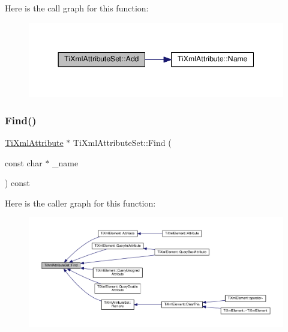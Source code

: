Here is the call graph for this function\+:\nopagebreak
\begin{figure}[H]
\begin{center}
\leavevmode
\includegraphics[width=344pt]{class_ti_xml_attribute_set_a745e50ddaae3bee93e4589321e0b9c1a_cgraph}
\end{center}
\end{figure}
\mbox{\label{class_ti_xml_attribute_set_a6d4f03bb84f70c78171db27a869225c1}} 
\subsubsection{\texorpdfstring{Find()}{Find()}}
{\footnotesize\ttfamily \hyperlink{class_ti_xml_attribute}{Ti\+Xml\+Attribute} $\ast$ Ti\+Xml\+Attribute\+Set\+::\+Find (\begin{DoxyParamCaption}\item[{const char $\ast$}]{\+\_\+name }\end{DoxyParamCaption}) const}

Here is the caller graph for this function\+:\nopagebreak
\begin{figure}[H]
\begin{center}
\leavevmode
\includegraphics[width=350pt]{class_ti_xml_attribute_set_a6d4f03bb84f70c78171db27a869225c1_icgraph}
\end{center}
\end{figure}
\mbox{\label{class_ti_xml_attribute_set_a5e28f5d32f048fba85d04dc317495bdc}} 
